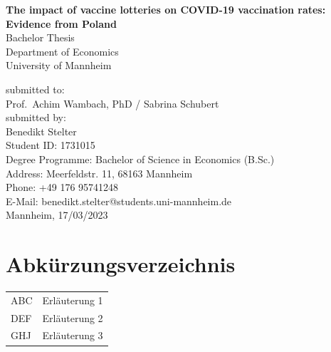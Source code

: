 \documentclass{scrbook}
\begin{document}
	
\frontmatter
\begin{titlepage}

\begin{center}

\vspace*{1,2cm}

\huge {\bfseries The impact of vaccine lotteries on COVID-19 vaccination
rates: Evidence from Poland}\\[1.8cm]

\Large {Bachelor Thesis}\\[1cm]

\large {Department of Economics}\\[0.2cm]

\large {University of Mannheim}\\[0.5cm]

\end{center}

\vfill

\noindent submitted to:\\
Prof.~Achim Wambach, PhD / Sabrina Schubert\\[1cm]
submitted by:\\
Benedikt Stelter\\[1cm]
Student ID: 1731015\\
Degree Programme: Bachelor of Science in Economics (B.Sc.)\\[1cm]
Address: Meerfeldstr. 11, 68163 Mannheim\\
Phone: +49 176 95741248\\
E-Mail: benedikt.stelter@students.uni-mannheim.de\\[1cm]
Mannheim, 17/03/2023

\setcounter{page}{0}

\end{titlepage}

  \tableofcontents

\chapter*{Abkürzungsverzeichnis}\label{av}
\begin{tabular}{ll}
ABC & Erläuterung 1 \\
DEF & Erläuterung 2\\
GHJ & Erläuterung 3\\
\end{tabular}
\end{document}
